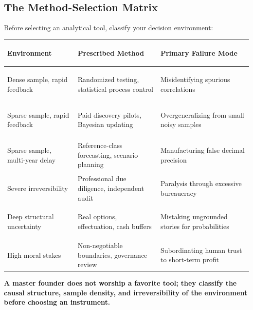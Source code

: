 \subsection{The Method-Selection Matrix}

Before selecting an analytical tool, classify your decision environment:

\begin{tcolorbox}[
  enhanced,
  colback=BayesSurface!60,
  colframe=BayesBorder,
  boxrule=0.5pt,
  arc=3pt,
  left=3pt,right=3pt,top=3pt,bottom=3pt,
  boxsep=1pt
]
\scriptsize
\begin{tabularx}{\linewidth}{>{\bfseries\raggedright\arraybackslash}p{2.2cm} X X}
\toprule
\textbf{Environment} & \textbf{Prescribed Method} & \textbf{Primary Failure Mode} \\
\midrule
Dense sample, rapid feedback & Randomized testing, statistical process control & Misidentifying spurious correlations \\
\addlinespace[2pt]
Sparse sample, rapid feedback & Paid discovery pilots, Bayesian updating & Overgeneralizing from small noisy samples \\
\addlinespace[2pt]
Sparse sample, multi-year delay & Reference-class forecasting, scenario planning & Manufacturing false decimal precision \\
\addlinespace[2pt]
Severe irreversibility & Professional due diligence, independent audit & Paralysis through excessive bureaucracy \\
\addlinespace[2pt]
Deep structural uncertainty & Real options, effectuation, cash buffers & Mistaking ungrounded stories for probabilities \\
\addlinespace[2pt]
High moral stakes & Non-negotiable boundaries, governance review & Subordinating human trust to short-term profit \\
\bottomrule
\end{tabularx}
\end{tcolorbox}

\textbf{A master founder does not worship a favorite tool; they classify the causal structure, sample density, and irreversibility of the environment before choosing an instrument.}
